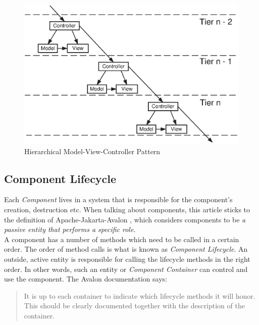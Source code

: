 \begin{figure}[ht]
    \begin{center}
       \includegraphics[scale=0.5]{eps/hmvc.eps}
       \caption{Hierarchical Model-View-Controller Pattern}
       \label{hierarchical_model_view_controller_figure}
    \end{center}
\end{figure}

\subsection{Component Lifecycle}
\label{component_lifecycle_heading}

Each \emph{Component} lives in a system that is responsible for the component's
creation, destruction etc. When talking about components, this article sticks
to the definition of Apache-Jakarta-Avalon \cite{jakarta}, which considers
components to be \emph{a passive entity that performs a specific role}.\\
A component has a number of methods which need to be called in a certain order.
The order of method calls is what is known as \emph{Component Lifecycle}.
An outside, active entity is responsible for calling the lifecycle methods
in the right order. In other words, such an entity or \emph{Component Container}
can control and use the component. The Avalon documentation \cite{jakarta} says:

\begin{quotation}
It is up to each container to indicate which lifecycle methods it will honor.
This should be clearly documented together with the description of the container.
\end{quotation}

